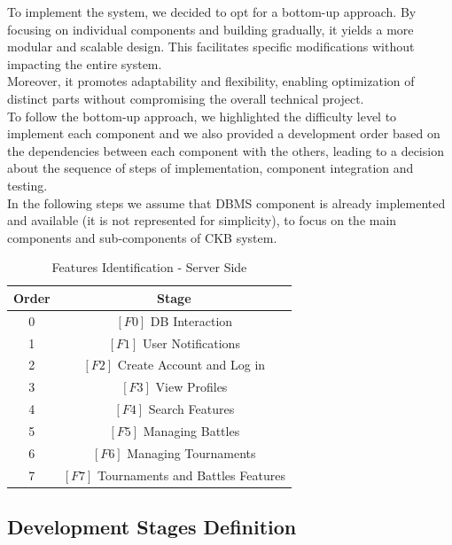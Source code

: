 \vspace{0.5cm}

To implement the system, we decided to opt for a bottom-up approach. By focusing on individual components and building gradually, it yields a more modular and scalable design. This facilitates specific modifications without impacting the entire system. 
\\Moreover, it promotes adaptability and flexibility, enabling optimization of distinct parts without compromising the overall technical project.
\\To follow the bottom-up approach, we highlighted the difficulty level to implement each component and we also provided a development order based on the dependencies between each component with the others, leading to a decision about the sequence of steps of implementation, component integration and testing. 
\\In the following steps we assume that DBMS component is already implemented and available (it is not represented for simplicity), to focus on the main components and sub-components of CKB system. 

\begin{table}[H]
    \centering
    \begin{tabular}{|c|c|}
        \hline
        Order & Stage\\
        \hline
        0 &
        $[F0]$ DB Interaction\\
        \hline
        1 & 
        $[F1]$ User Notifications\\
        \hline
        2 & 
        $[F2]$ Create Account and Log in\\
        \hline
        3 & 
        $[F3]$ View Profiles\\
        \hline
        4 &
        $[F4]$ Search Features\\
        \hline
        5 &
        $[F5]$ Managing Battles\\
        \hline
        6 & 
        $[F6]$ Managing Tournaments\\
        \hline
        7 &
        $[F7]$ Tournaments and Battles Features\\
        \hline
    \end{tabular}
    \caption*{Features Identification - Server Side}
\end{table}

\vspace{1cm}

\subsection{Development Stages Definition}

